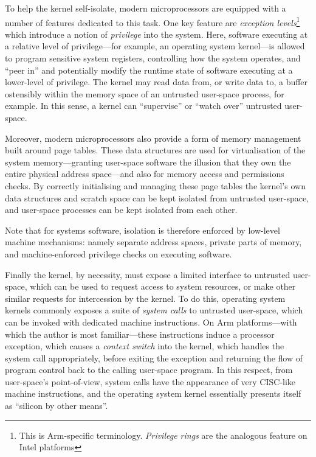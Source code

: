 \documentclass[a4paper, UKenglish, cleveref, autoref, thm-restate]{lipics-v2021}
\begin{document}
To help the kernel self-isolate, modern microprocessors are equipped with a number of features dedicated to this task.
One key feature are \emph{exception levels}\footnote{This is Arm-specific terminology.  \emph{Privilege rings} are the analogous feature on Intel platforms} which introduce a notion of \emph{privilege} into the system.
Here, software executing at a relative level of privilege---for example, an operating system kernel---is allowed to program sensitive system registers, controlling how the system operates, and ``peer in'' and potentially modify the runtime state of software executing at a lower-level of privilege.
The kernel may read data from, or write data to, a buffer ostensibly within the memory space of an untrusted user-space process, for example.
In this sense, a kernel can ``supervise'' or ``watch over'' untrusted user-space.

Moreover, modern microprocessors also provide a form of memory management built around page tables.
These data structures are used for virtualisation of the system memory---granting user-space software the illusion that they own the entire physical address space---and also for memory access and permissions checks.
By correctly initialising and managing these page tables the kernel's own data structures and scratch space can be kept isolated from untrusted user-space, and user-space processes can be kept isolated from each other.

Note that for systems software, isolation is therefore enforced by low-level machine mechanisms: namely separate address spaces, private parts of memory, and machine-enforced privilege checks on executing software.

Finally the kernel, by necessity, must expose a limited interface to untrusted user-space, which can be used to request access to system resources, or make other similar requests for intercession by the kernel.
To do this, operating system kernels commonly exposes a suite of \emph{system calls} to untrusted user-space, which can be invoked with dedicated machine instructions.
On Arm platforms---with which the author is most familiar---these instructions induce a processor exception, which causes a \emph{context switch} into the kernel, which handles the system call appropriately, before exiting the exception and returning the flow of program control back to the calling user-space program.
In this respect, from user-space's point-of-view, system calls have the appearance of very CISC-like machine instructions, and the operating system kernel essentially presents itself as ``silicon by other means''.
\end{document}
